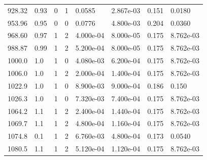 \documentclass[preview]{standalone}
\begin{document}
{{{\begin{tabular}{L{1.2cm}C{1.2cm} C{0.3cm}C{0.5cm} C{1.4cm}C{1.4cm} C{1.4cm}C{1.4cm}}
  928.32  &  0.93  & 0     &  1 &  0.0585  & 2.867e-03  & 0.151 &  0.0180   \\ 
  953.96  &  0.95  & 0     &  0 &  0.0776  & 4.800e-03  & 0.204 &  0.0360   \\ 
  968.60  &  0.97  & 1     &  2 &  4.000e-04  & 8.000e-05  & 0.175 &  8.762e-03   \\ 
  988.87  &  0.99  & 1     &  2 &  5.200e-04  & 8.000e-05  & 0.175 &  8.762e-03   \\ 
  1000.0  &   1.0  & 1     &  0 &  4.080e-03  & 6.200e-04  & 0.175 &  8.762e-03   \\ 
  1006.0  &   1.0  & 1     &  2 &  2.000e-04  & 1.400e-04  & 0.175 &  8.762e-03   \\ 
  1022.9  &   1.0  & 1     &  0 &  8.900e-03  & 9.000e-04  & 0.186 &  0.150   \\ 
  1026.3  &   1.0  & 1     &  0 &  7.320e-03  & 7.400e-04  & 0.175 &  8.762e-03   \\ 
  1064.2  &   1.1  & 1     &  2 &  2.400e-04  & 1.440e-04  & 0.175 &  8.762e-03   \\ 
  1069.7  &   1.1  & 1     &  2 &  4.800e-04  & 1.160e-04  & 0.175 &  8.762e-03   \\ 
  1074.8  &   0.1  & 1     &  2 &  6.760e-03  & 4.800e-04  & 0.173 &  0.0540   \\ 
  1080.5  &   1.1  & 1     &  2 &  5.120e-04  & 1.120e-04  & 0.175 &  8.762e-03   \\ 
\hline 
\end{tabular} 

}}}
\end{document}
